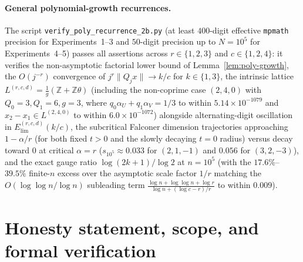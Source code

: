 \documentclass[11pt]{article}
\theoremstyle{definition}
\theoremstyle{remark}
\newcommand{\Z}{\mathbb{Z}}
\begin{document}
\paragraph{General polynomial-growth recurrences.} The script
\texttt{verify\_\allowbreak poly\_\allowbreak recurrence\_\allowbreak 2b.py}
(at least $400$-digit effective \texttt{mpmath} precision for Experiments~1--3
and $50$-digit precision up to $N=10^5$ for Experiments~4--5) passes all
assertions across $r\in\{1,2,3\}$ and $c\in\{1,2,4\}$: it verifies the
non-asymptotic factorial lower bound of Lemma~\ref{lem:poly-growth}, the
$O(j^{-r})$ convergence of $j^r\|Q_jx\|\to k/c$ for $k\in\{1,3\}$, the
intrinsic lattice $L^{(r,c,d)}=\frac{1}{g}(\Z+\Z\theta)$ (including the
non-coprime case $(2,4,0)$ with $Q_0=3,Q_1=6,g=3$, where
$q_0\alpha_U+q_1\alpha_V=1/3$ to within $5.14\times10^{-1079}$ and $x_2-x_1\in
L^{(2,4,0)}$ to within $6.0\times10^{-1072}$) alongside alternating-digit
oscillation in $E_{\mathrm{lim}}^{(r,c,d)}(k/c)$, the subcritical Falconer
dimension trajectories approaching $1-\alpha/r$ (for both fixed $t>0$ and the
slowly decaying $t=0$ radius) versus decay toward $0$ at critical $\alpha=r$
($s_{10^5}\approx0.033$ for $(2,1,-1)$ and $0.056$ for $(3,2,-3)$), and the
exact gauge ratio $\log(2k+1)/\log2$ at $n=10^5$ (with the $17.6\%$--$39.5\%$
finite-$n$ excess over the asymptotic scale factor $1/r$ matching the
$O(\log\log n/\log n)$ subleading term $\frac{\log n+\log\log n+\log r}{\log n+(\log c-r)/r}$
to within $0.009$).

\section{Honesty statement, scope, and formal verification}\label{sec:verification}
\end{document}
